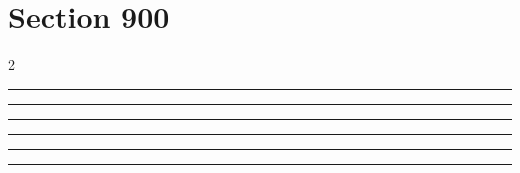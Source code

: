 \documentclass[11pt,a4paper]{article}
\begin{document}
\section{Section 900}
\begin{multicols}{2}
\begin{swarmwrap}%
  \begin{minipage}[t]{2cm}
    \centering
    \textcolor{blue!30}{\rule{\linewidth}{2cm}}
  \end{minipage}%
\end{swarmwrap}%
\swarmwrapnext\lipsum[1]\lipsum[2]
\end{multicols}
\begin{swarmwrap}%
  \begin{minipage}[t]{3cm}
    \centering
    \textcolor{red!20}{\rule{\linewidth}{3cm}}
  \end{minipage}%
\end{swarmwrap}%
\swarmwrapnext\lipsum[1]\lipsum[2]
\begin{swarmwrap}%
  \begin{minipage}[t]{4cm}
    \centering
    \textcolor{red!20}{\rule{\linewidth}{4cm}}
  \end{minipage}%
\end{swarmwrap}%
\swarmwrapnext\lipsum[1]\lipsum[2]\lipsum[3]
\begin{swarmwrap}%
  \begin{minipage}[t]{5cm}
    \centering
    \textcolor{red!20}{\rule{\linewidth}{5cm}}
  \end{minipage}%
\end{swarmwrap}%
\swarmwrapnext\lipsum[1]\lipsum[2]\lipsum[3]\lipsum[4]
\begin{swarmwrap}%
  \begin{minipage}[t]{2cm}
    \centering
    \textcolor{red!20}{\rule{\linewidth}{6cm}}
  \end{minipage}%
\end{swarmwrap}%
\swarmwrapnext\lipsum[1]\lipsum[2]\lipsum[3]\lipsum[4]\lipsum[5]
\begin{swarmwrap}%
  \begin{minipage}[t]{3cm}
    \centering
    \textcolor{red!20}{\rule{\linewidth}{7cm}}
  \end{minipage}%
\end{swarmwrap}%
\end{document}
